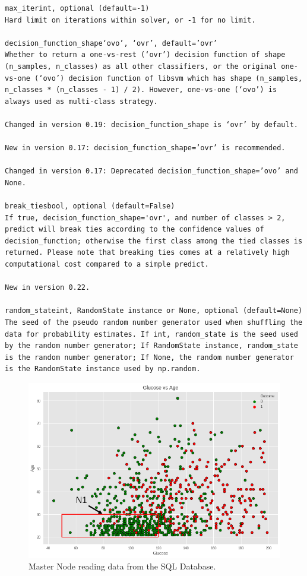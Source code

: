 \documentclass[12pt]{article}
\begin{document}
\begin{verbatim}
max_iterint, optional (default=-1)
Hard limit on iterations within solver, or -1 for no limit.

decision_function_shape‘ovo’, ‘ovr’, default=’ovr’
Whether to return a one-vs-rest (‘ovr’) decision function of shape (n_samples, n_classes) as all other classifiers, or the original one-vs-one (‘ovo’) decision function of libsvm which has shape (n_samples, n_classes * (n_classes - 1) / 2). However, one-vs-one (‘ovo’) is always used as multi-class strategy.

Changed in version 0.19: decision_function_shape is ‘ovr’ by default.

New in version 0.17: decision_function_shape=’ovr’ is recommended.

Changed in version 0.17: Deprecated decision_function_shape=’ovo’ and None.

break_tiesbool, optional (default=False)
If true, decision_function_shape='ovr', and number of classes > 2, predict will break ties according to the confidence values of decision_function; otherwise the first class among the tied classes is returned. Please note that breaking ties comes at a relatively high computational cost compared to a simple predict.

New in version 0.22.

random_stateint, RandomState instance or None, optional (default=None)
The seed of the pseudo random number generator used when shuffling the data for probability estimates. If int, random_state is the seed used by the random number generator; If RandomState instance, random_state is the random number generator; If None, the random number generator is the RandomState instance used by np.random.
\end{verbatim}
\clearpage



\begin{figure}[ht]
\centering
\includegraphics[width=1\textwidth]{download(1).png}
\caption{Master Node reading data from the SQL Database.}
\end{figure}
\end{document}
